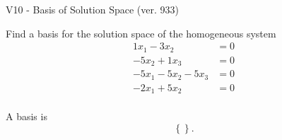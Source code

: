 \begin{exercise}
  \begin{exerciseTitle}V10 - Basis of Solution Space (ver. 933)\end{exerciseTitle}
  \begin{exerciseStatement}
    Find a basis for the solution space of the homogeneous system 
\begin{align*}
 1 x_ 1 -3 x_ 2 &= 0  \\ 
  -5 x_ 2 + 1 x_ 3 &= 0  \\ 
  -5 x_ 1 -5 x_ 2 -5 x_ 3 &= 0  \\ 
  -2 x_ 1 + 5 x_ 2 &= 0  \\ 
 \end{align*}


 
  \end{exerciseStatement}

  \begin{exerciseAnswer}
   A basis is   
\[\left\{\right\}.\]

  


  \end{exerciseAnswer}
\end{exercise}